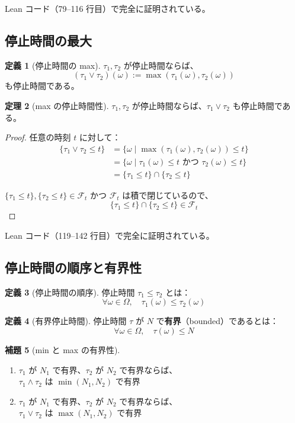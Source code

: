 \documentclass[12pt,a4paper,ja=standard]{bxjsarticle}
\theoremstyle{definition}
\newtheorem{definition}{定義}[section]
\newtheorem{theorem}[definition]{定理}
\newtheorem{lemma}[definition]{補題}
\begin{document}
Lean コード（79--116 行目）で完全に証明されている。

\subsection{停止時間の最大}

\begin{definition}[停止時間の max]
$\tau_1, \tau_2$ が停止時間ならば、
\[
(\tau_1 \vee \tau_2)(\omega) := \max(\tau_1(\omega), \tau_2(\omega))
\]
も停止時間である。
\end{definition}

\begin{theorem}[max の停止時間性]
$\tau_1, \tau_2$ が停止時間ならば、$\tau_1 \vee \tau_2$ も停止時間である。
\end{theorem}

\begin{proof}
任意の時刻 $t$ に対して：
\begin{align*}
\{\tau_1 \vee \tau_2 \leq t\} 
&= \{\omega \mid \max(\tau_1(\omega), \tau_2(\omega)) \leq t\} \\
&= \{\omega \mid \tau_1(\omega) \leq t \text{ かつ } \tau_2(\omega) \leq t\} \\
&= \{\tau_1 \leq t\} \cap \{\tau_2 \leq t\}
\end{align*}

$\{\tau_1 \leq t\}, \{\tau_2 \leq t\} \in \mathcal{F}_t$ かつ $\mathcal{F}_t$ は積で閉じているので、
\[
\{\tau_1 \leq t\} \cap \{\tau_2 \leq t\} \in \mathcal{F}_t
\]
\end{proof}

Lean コード（119--142 行目）で完全に証明されている。

\subsection{停止時間の順序と有界性}

\begin{definition}[停止時間の順序]
停止時間 $\tau_1 \leq \tau_2$ とは：
\[
\forall \omega \in \Omega, \quad \tau_1(\omega) \leq \tau_2(\omega)
\]
\end{definition}

\begin{definition}[有界停止時間]
停止時間 $\tau$ が $N$ で\textbf{有界}（bounded）であるとは：
\[
\forall \omega \in \Omega, \quad \tau(\omega) \leq N
\]
\end{definition}

\begin{lemma}[min と max の有界性]
\begin{enumerate}
    \item $\tau_1$ が $N_1$ で有界、$\tau_2$ が $N_2$ で有界ならば、\\
    $\tau_1 \wedge \tau_2$ は $\min(N_1, N_2)$ で有界
    
    \item $\tau_1$ が $N_1$ で有界、$\tau_2$ が $N_2$ で有界ならば、\\
    $\tau_1 \vee \tau_2$ は $\max(N_1, N_2)$ で有界
\end{enumerate}
\end{lemma}
\end{document}
